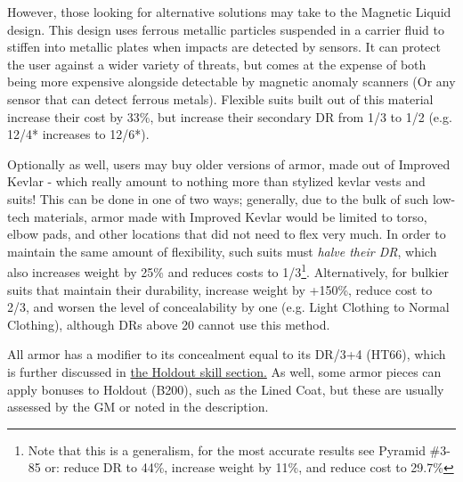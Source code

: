 However, those looking for alternative solutions may take to the Magnetic Liquid design. This design uses ferrous metallic particles suspended in a carrier fluid to stiffen into metallic plates when impacts are detected by sensors. It can protect the user against a wider variety of threats, but comes at the expense of both being more expensive alongside detectable by magnetic anomaly scanners (Or any sensor that can detect ferrous metals). Flexible suits built out of this material increase their cost by 33\%, but increase their secondary DR from 1/3 to 1/2 (e.g. 12/4* increases to 12/6*).

Optionally as well, users may buy older versions of armor, made out of Improved Kevlar - which really amount to nothing more than stylized kevlar vests and suits! This can be done in one of two ways; generally, due to the bulk of such low-tech materials, armor made with Improved Kevlar would be limited to torso, elbow pads, and other locations that did not need to flex very much. In order to maintain the same amount of flexibility, such suits must \textit{halve their DR}, which also increases weight by 25\% and reduces costs to 1/3\footnote{Note that this is a generalism, for the most accurate results see Pyramid \#3-85 or: reduce DR to 44\%, increase weight by 11\%, and reduce cost to 29.7\%}. Alternatively, for bulkier suits that maintain their durability, increase weight by +150\%, reduce cost to 2/3, and worsen the level of concealability by one (e.g. Light Clothing to Normal Clothing), although DRs above 20 cannot use this method.

All armor has a modifier to its concealment equal to its DR/3+4 (HT66), which is further discussed in \hyperref[holdout]{the Holdout skill section.} As well, some armor pieces can apply bonuses to Holdout (B200), such as the Lined Coat, but these are usually assessed by the GM or noted in the description.

